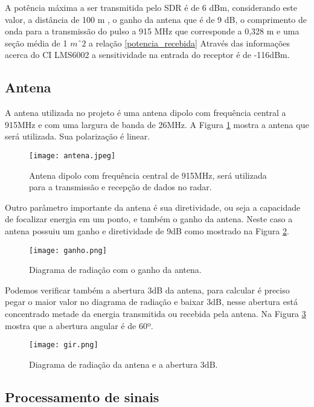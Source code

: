 A potência máxima a ser transmitida pelo SDR é de 6 dBm, considerando este valor, a distância de 100 m , o ganho da antena que é de 9  dB, o comprimento de onda para a transmissão do pulso a 915 MHz que corresponde a 0,328 m e uma seção média de 1 $mˆ2$ a relação \ref{potencia_recebida}
Através das informações acerca do CI LMS6002 a sensitividade na entrada do receptor é de -116dBm.

\subsection{Antena}
A antena utilizada no projeto é uma antena dipolo com frequência central a 915MHz e com uma largura de banda de 26MHz. A Figura \ref{antena} mostra a antena que será utilizada. Sua polarização é linear. 

\begin{figure}[H]
    \centering
   \texttt{[image: antena.jpeg]}
   \caption{Antena dipolo com frequência central de 915MHz, será utilizada para a transmissão e recepção de dados no radar.}
   \label{antena}
    \end{figure}

Outro parâmetro importante da antena é sua diretividade, ou seja a capacidade de focalizar energia em um ponto, e também o ganho da antena. Neste caso a antena possuiu um ganho e diretividade de 9dB como mostrado na Figura \ref{ganho}.

\begin{figure}[H]
    \centering
   \texttt{[image: ganho.png]}
   \caption{Diagrama de radiação com o ganho da antena.}
   \label{ganho}
    \end{figure}

Podemos verificar também a abertura 3dB da antena, para calcular é preciso pegar o maior valor no diagrama de radiação e baixar 3dB, nesse abertura está concentrado metade da energia transmitida ou recebida pela antena. Na Figura \ref{dr} mostra que a abertura angular é de 60º.

\begin{figure}[t]
    \centering
   \texttt{[image: gir.png]}
   \caption{Diagrama de radiação da antena e a
abertura 3dB.}
   \label{dr}
    \end{figure}


\subsection{Processamento de sinais}
 
